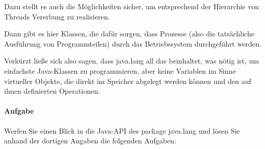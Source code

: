 Dazu stellt es auch die Möglichkeiten sicher, um entsprechend der Hierarchie von Threads Vererbung zu realisieren.

Dann gibt es hier Klassen, die dafür sorgen, dass Prozesse (also die tatsächliche Ausführung von Programmteilen) durch das Betriebssystem durchgeführt werden.

Verkürzt ließe sich also sagen, dass java.lang all das beinhaltet, was nötig ist, um einfachste Java-Klassen zu programmieren, aber keine Variablen im Sinne virtueller Objekte, die direkt im Speicher abgelegt werden können und den auf ihnen definierten Operationen.

\paragraph{Aufgabe}

Werfen Sie einen Blick in die Java-API des package java.lang und lösen Sie anhand der dortigen Angaben die folgenden Aufgaben:

